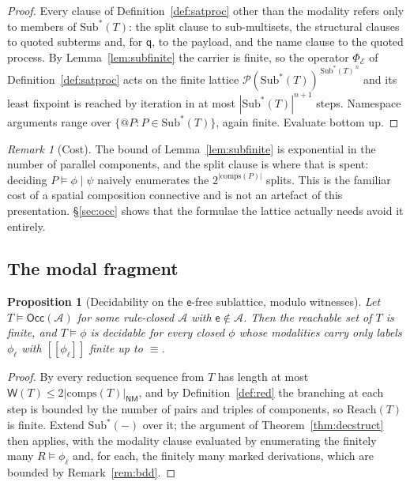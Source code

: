 \documentclass[11pt]{article}
\makeatletter
\theoremstyle{plain}
\newtheorem{proposition}[theorem]{Proposition}
\theoremstyle{definition}
\theoremstyle{remark}
\newtheorem{remark}[theorem]{Remark}
\newcommand{\quo}[1]{@#1}
\newcommand{\ev}{\mathsf{e}}
\newcommand{\qq}{\mathsf{q}}
\newcommand{\scong}{\equiv}
\newcommand{\env}{\mathcal{E}}
\newcommand{\sat}{\models}
\newcommand{\Occ}{\mathsf{Occ}}
\newcommand{\Atm}{\mathcal{A}}
\newcommand{\comps}[1]{\mathrm{comps}(#1)}
\newcommand{\Sub}[1]{\mathrm{Sub}^{*}(#1)}
\newcommand{\shp}{\mathsf{NM}}
\newcommand{\Wt}{\mathsf{W}}
\newcommand{\sem}[1]{[\![#1]\!]}
\makeatother
\begin{document}
\begin{proof}
Every clause of Definition~\ref{def:satproc} other than the modality refers only
to members of $\Sub{T}$: the split clause to sub-multisets, the structural
clauses to quoted subterms and, for $\qq$, to the payload, and the name clause
to the quoted process. By Lemma~\ref{lem:subfinite} the carrier is finite, so
the operator $\Phi_{\env}$ of Definition~\ref{def:satproc} acts on the finite
lattice $\mathcal{P}(\Sub{T})^{\,\Sub{T}^{\,n}}$ and its least fixpoint is
reached by iteration in at most $|\Sub{T}|^{n+1}$ steps. Namespace arguments
range over $\{\quo{P} : P \in \Sub{T}\}$, again finite. Evaluate bottom up.
\end{proof}

\begin{remark}[Cost]
\label{rem:cost}
The bound of Lemma~\ref{lem:subfinite} is exponential in the number of parallel
components, and the split clause is where that is spent: deciding
$P \sat \phi \mid \psi$ naively enumerates the $2^{|\comps{P}|}$ splits. This is
the familiar cost of a spatial composition connective and is not an artefact of
this presentation. \S\ref{sec:occ} shows that the formulae the lattice actually
needs avoid it entirely.
\end{remark}

\subsection{The modal fragment}

\begin{proposition}[Decidability on the $\ev$-free sublattice, modulo witnesses]
\label{prop:decmodal}
Let $T \sat \Occ(\Atm)$ for some rule-closed $\Atm$ with $\ev \notin \Atm$.
Then the reachable set of $T$ is finite, and $T \sat \phi$ is decidable for
every closed $\phi$ whose modalities carry only labels $\phi_{\ell}$ with
$\sem{\phi_{\ell}}$ finite up to $\scong$.
\end{proposition}

\begin{proof}
By \cite[Prop.~9.9]{rhocomb3} every reduction sequence from $T$ has length at
most $\Wt(T) \leq 2|\comps{T}|_{\shp}$, and by Definition~\ref{def:red} the branching at each
step is bounded by the number of pairs and triples of components, so
$\mathrm{Reach}(T)$ is finite. Extend $\Sub{-}$ over it; the argument of
Theorem~\ref{thm:decstruct} then applies, with the modality clause evaluated by
enumerating the finitely many $R \sat \phi_{\ell}$ and, for each, the finitely
many marked derivations, which are bounded by Remark~\ref{rem:bdd}.
\end{proof}
\end{document}
